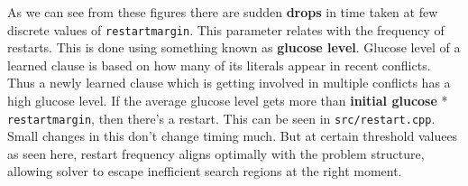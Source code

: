 \documentclass{article}
\begin{document}
    As we can see from these figures there are sudden \textbf{drops} in time
    taken at few discrete values of \texttt{restartmargin}. This parameter
    relates with the frequency of restarts. This is done using something known
    as \textbf{glucose level}. Glucose level of a learned clause is based on
    how many of its literals appear in recent conflicts. Thus a newly learned
    clause which is getting involved in multiple conflicts has a high glucose
    level. If the average glucose level gets more than \textbf{initial glucose}
    * \texttt{restartmargin}, then there's a restart. This can be seen in
    \texttt{src/restart.cpp}. Small changes in this don't change timing much.
    But at certain threshold valuees as seen here, restart frequency aligns
    optimally with the problem structure, allowing solver to escape inefficient
    search regions at the right moment.
\end{document}
